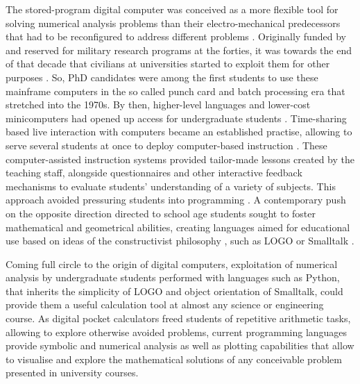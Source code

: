 The stored-program digital computer was conceived as a more flexible tool for solving numerical analysis problems than their electro-mechanical predecessors that had to be reconfigured to address different problems \cite{kurrer_konrad_2010}.
Originally funded by and reserved for military research programs at the forties, it was towards the end of that decade that civilians at universities started to exploit them for other purposes \cite{simon_h_lavington_history_1975}. 
So, PhD candidates were among the first students to use these mainframe computers in the so called punch card and batch processing era that stretched into the 1970s. 
By then, higher-level languages and lower-cost minicomputers had opened up access for undergraduate students \cite{kemeny_dartmouth_1968}.
Time-sharing based live interaction with computers became an established practise, allowing to serve several students at once to deploy computer-based instruction \cite{tidball_using_1978}.
These computer-assisted instruction systems provided tailor-made lessons created by the teaching staff, alongside questionnaires and other interactive feedback mechanisms to evaluate students' understanding of a variety of subjects. This approach avoided pressuring students into programming \cite{cope_little_2023}.
A contemporary push on the opposite direction directed to school age students sought to foster mathematical and geometrical abilities, creating languages aimed for educational use based on ideas of the constructivist philosophy \cite{ben-ari_constructivism_1998}, such as LOGO \cite{solomon_history_2020} or Smalltalk \cite{kay_early_1993}.

Coming full circle to the origin of digital computers, exploitation of numerical analysis by undergraduate students performed with languages such as Python, that inherits the simplicity of LOGO and object orientation of Smalltalk, could provide them a useful calculation tool at almost any science or engineering course.
As digital pocket calculators freed students of repetitive arithmetic tasks, allowing to explore otherwise avoided problems, current programming languages provide symbolic and numerical analysis as well as plotting capabilities that allow to visualise and explore the mathematical solutions of any conceivable problem presented in university courses.